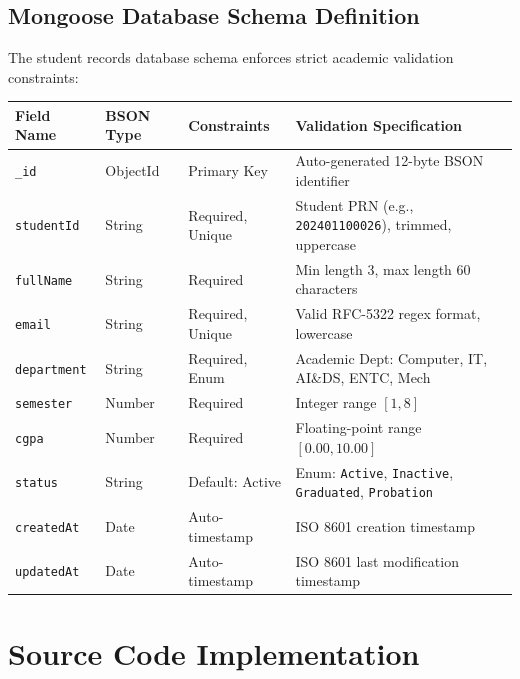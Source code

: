 \documentclass[11pt,a4paper]{article}
\begin{document}
\subsection{Mongoose Database Schema Definition}
The student records database schema enforces strict academic validation constraints:
\begin{center}
\renewcommand{\arraystretch}{1.25}
\begin{tabularx}{\textwidth}{|l|l|l|X|}
\hline
\textbf{Field Name} & \textbf{BSON Type} & \textbf{Constraints} & \textbf{Validation Specification} \\ \hline
\texttt{\_id} & ObjectId & Primary Key & Auto-generated 12-byte BSON identifier \\ \hline
\texttt{studentId} & String & Required, Unique & Student PRN (e.g., \texttt{202401100026}), trimmed, uppercase \\ \hline
\texttt{fullName} & String & Required & Min length 3, max length 60 characters \\ \hline
\texttt{email} & String & Required, Unique & Valid RFC-5322 regex format, lowercase \\ \hline
\texttt{department} & String & Required, Enum & Academic Dept: Computer, IT, AI\&DS, ENTC, Mech \\ \hline
\texttt{semester} & Number & Required & Integer range $[1, 8]$ \\ \hline
\texttt{cgpa} & Number & Required & Floating-point range $[0.00, 10.00]$ \\ \hline
\texttt{status} & String & Default: Active & Enum: \texttt{Active}, \texttt{Inactive}, \texttt{Graduated}, \texttt{Probation} \\ \hline
\texttt{createdAt} & Date & Auto-timestamp & ISO 8601 creation timestamp \\ \hline
\texttt{updatedAt} & Date & Auto-timestamp & ISO 8601 last modification timestamp \\ \hline
\end{tabularx}
\end{center}

\newpage
\section{Source Code Implementation}
\end{document}
